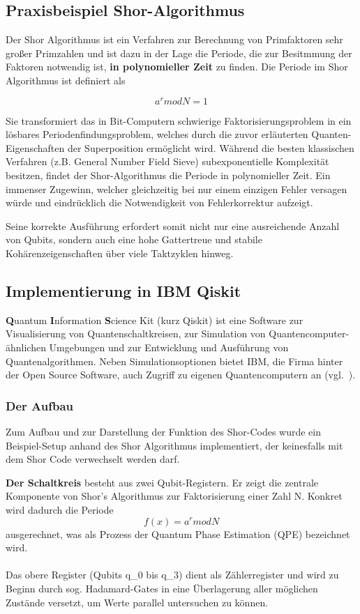 \subsection{Praxisbeispiel Shor-Algorithmus}
Der Shor Algorithmus ist ein Verfahren zur Berechnung von Primfaktoren sehr großer Primzahlen und ist dazu in der Lage die Periode, die zur Besitmmung der Faktoren notwendig ist, \textbf{in polynomieller Zeit} zu finden.
Die Periode im Shor Algorithmus ist definiert als

\begin{equation}
    a^r mod N = 1
\end{equation}

Sie transformiert das in Bit-Computern schwierige Faktorisierungsproblem in ein lösbares Periodenfindungsproblem, welches durch die zuvor erläuterten Quanten-Eigenschaften der Superposition ermöglicht wird.
Während die besten klassischen Verfahren (z.B. General Number Field Sieve) subexponentielle Komplexität besitzen, findet der Shor-Algorithmus die Periode in polynomieller Zeit. Ein immenser Zugewinn, welcher gleichzeitig bei nur einem einzigen Fehler versagen würde und eindrücklich die Notwendigkeit von Fehlerkorrektur aufzeigt.

Seine korrekte Ausführung erfordert somit nicht nur eine ausreichende Anzahl von Qubits, sondern auch eine hohe Gattertreue und stabile Kohärenzeigenschaften über viele Taktzyklen hinweg.

\subsection{Implementierung in IBM Qiskit}
\textbf{Q}uantum \textbf{I}nformation \textbf{S}cience Kit (kurz Qiskit) ist eine Software zur Visualisierung von Quantenschaltkreisen, zur Simulation von Quantencomputer-ähnlichen Umgebungen und zur Entwicklung und Ausführung von Quantenalgorithmen. Neben Simulationsoptionen bietet IBM, die Firma hinter der Open Source Software, auch Zugriff zu eigenen Quantencomputern an (vgl.~\cite{learning_how_2023}).


\subsubsection{Der Aufbau}
Zum Aufbau und zur Darstellung der Funktion des Shor-Codes wurde ein Beispiel-Setup anhand des Shor Algorithmus implementiert, der keinesfalls mit dem Shor Code verwechselt werden darf.


\textbf{Der Schaltkreis} besteht aus zwei Qubit-Registern. Er zeigt die zentrale Komponente von Shor's Algorithmus zur Faktorisierung einer Zahl N. Konkret wird dadurch die Periode 
\begin{equation}
    f(x) = a^r mod N
\end{equation}
ausgerechnet, was als Prozess der
Quantum Phase Estimation (QPE) bezeichnet wird.
\\
\\
 Das obere Register (Qubits q\_0 bis q\_3) dient als Zählerregister und wird zu Beginn durch sog. Hadamard-Gates in eine Überlagerung aller möglichen Zustände versetzt, um Werte parallel untersuchen zu können.

